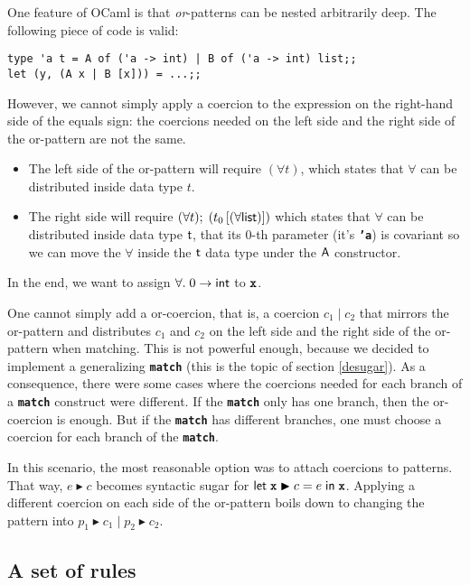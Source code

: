 \documentclass[10pt,a4paper,twoside,titlepage,twocolumn]{article}
\newcommand{\code}[1]{\textbf{\texttt{#1}}}
\begin{document}
One feature of OCaml is that \emph{or}-patterns can be nested arbitrarily deep.
The following piece of code is valid:

\begin{verbatim}
type 'a t = A of ('a -> int) | B of ('a -> int) list;;
let (y, (A x | B [x])) = ...;;
\end{verbatim}

However, we cannot simply apply a coercion to the expression on the right-hand
side of the equals sign: the coercions needed on the left side and the right
side of the or-pattern are not the same.
\begin{itemize}
  \item The left side of the or-pattern will require $(\forall t)$, which states
    that $\forall$ can be distributed inside data type $t$.
  \item The right side will require
    $(\forall t);\;(t_0\left[ (\forall \text{\textsf{list}}) \right])$
    which states
    that $\forall$ can be distributed inside data type $\text{\textsf{t}}$, that its
    $0$-th parameter (it's \code{'a}) is covariant so we can move the $\forall$
    inside the $\text{\textsf{t}}$ data type under the $\text{\textsf{A}}$ constructor.
\end{itemize}
In the end, we want to assign $\forall.\;0\to\text{\textsf{int}}$ to $\evid$.

One cannot simply add a or-coercion, that is, a coercion $c_1\;|\;c_2$ that
mirrors the or-pattern and distributes $c_1$ and $c_2$ on the left side and the
right side of the or-pattern when matching. This is not powerful enough, because
we decided to implement a generalizing \code{match} (this is the topic of
section \vref{desugar}). As a consequence, there were some cases where the
coercions needed for each branch of a \code{match} construct were different. If
the \code{match} only has one branch, then the or-coercion is enough. But if the
\code{match} has different branches, one must choose a coercion for each branch
of the \code{match}.

In this scenario, the most reasonable option was to attach coercions to
patterns. That way, $e \blacktriangleright c$ becomes syntactic sugar for
$\kwd{let}\; \evid \blacktriangleright c = e\;\kwd{in}\; \evid$. Applying a
different coercion on each side of the or-pattern boils down to changing the
pattern into $p_1 \blacktriangleright c_1\;|\; p_2 \blacktriangleright c_2$.

\subsection{A set of rules}
\end{document}
